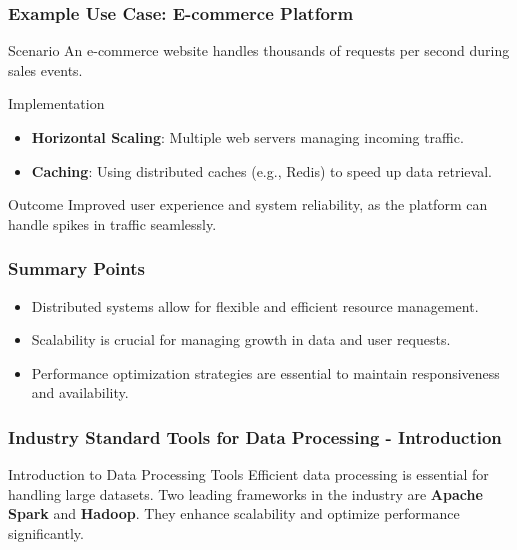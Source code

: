 \documentclass[aspectratio=169]{beamer}
\begin{document}
\begin{frame}[fragile]
    \frametitle{Example Use Case: E-commerce Platform}
    \begin{block}{Scenario}
        An e-commerce website handles thousands of requests per second during sales events.
    \end{block}
    \begin{block}{Implementation}
        \begin{itemize}
            \item \textbf{Horizontal Scaling}: Multiple web servers managing incoming traffic.
            \item \textbf{Caching}: Using distributed caches (e.g., Redis) to speed up data retrieval.
        \end{itemize}
    \end{block}
    \begin{block}{Outcome}
        Improved user experience and system reliability, as the platform can handle spikes in traffic seamlessly.
    \end{block}
\end{frame}

\begin{frame}[fragile]
    \frametitle{Summary Points}
    \begin{itemize}
        \item Distributed systems allow for flexible and efficient resource management.
        \item Scalability is crucial for managing growth in data and user requests.
        \item Performance optimization strategies are essential to maintain responsiveness and availability.
    \end{itemize}
\end{frame}

\begin{frame}[fragile]
    \frametitle{Industry Standard Tools for Data Processing - Introduction}
    \begin{block}{Introduction to Data Processing Tools}
        Efficient data processing is essential for handling large datasets. Two leading frameworks in the industry are \textbf{Apache Spark} and \textbf{Hadoop}. They enhance scalability and optimize performance significantly.
    \end{block}
\end{frame}
\end{document}
